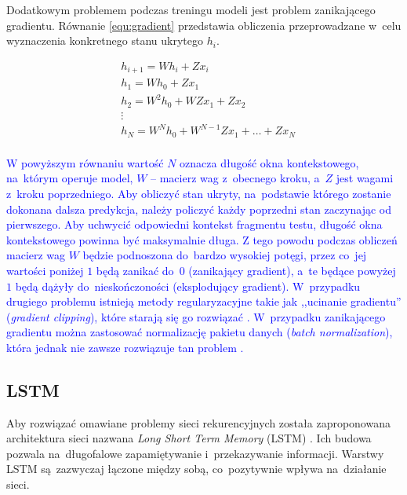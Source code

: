 \documentclass[data-science]{agh-wi} %
\begin{document}
Dodatkowym problemem podczas treningu modeli jest problem zanikającego gradientu. Równanie \ref*{equ:gradient} przedstawia obliczenia przeprowadzane w~celu wyznaczenia konkretnego stanu ukrytego $h_i$.

\begin{equation} 
    \begin{aligned}
         & h_{i+1}=Wh_i+Zx_i  \\
         & h_1=Wh_0+Zx_1  \\
         & h_2=W^2h_0+WZx_1+Zx_2 \\
         & \vdots \\
         & h_N = W^Nh_0+W^{N-1}Zx_1 +\dots + Zx_N\\
    \end{aligned}
    \label{equ:gradient}
\end{equation}

\textcolor{blue}{W powyższym równaniu wartość $N$ oznacza długość okna kontekstowego, na~którym operuje model, $W$ -- macierz wag z~obecnego kroku, a~$Z$ jest wagami z~kroku poprzedniego. Aby obliczyć stan ukryty, na~podstawie którego zostanie dokonana dalsza predykcja, należy policzyć każdy poprzedni stan zaczynając od pierwszego. Aby uchwycić odpowiedni kontekst fragmentu testu, długość okna kontekstowego powinna być maksymalnie długa. Z tego powodu podczas obliczeń macierz wag $W$ będzie podnoszona do~bardzo wysokiej potęgi, przez co~jej wartości poniżej $1$ będą zanikać do~$0$ (zanikający gradient), a~te będące powyżej $1$ będą dążyły do~nieskończoności (eksplodujący gradient). W~przypadku drugiego problemu istnieją metody regularyzacyjne takie jak ,,ucinanie gradientu'' (\textit{gradient clipping}), które starają się go rozwiązać \cite*{deeplearning_book}. W~przypadku zanikającego gradientu można zastosować normalizację pakietu danych (\textit{batch normalization}), która jednak nie zawsze rozwiązuje tan problem \cite*{batch_norm}.}

\subsection{LSTM}
Aby rozwiązać omawiane problemy sieci rekurencyjnych została zaproponowana architektura sieci nazwana \textit{Long Short Term Memory} (LSTM) \cite{lstm_og}. Ich budowa pozwala na~długofalowe zapamiętywanie i~przekazywanie informacji. Warstwy LSTM są~zazwyczaj łączone między sobą, co~pozytywnie wpływa na~działanie sieci.
\end{document}

